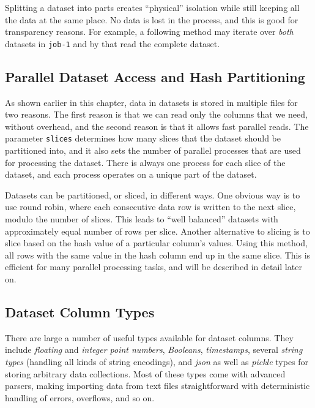 Splitting a dataset into parts creates ``physical'' isolation while
still keeping all the data at the same place.  No data is lost in the
process, and this is good for transparency reasons.  For example, a
following method may iterate over \textsl{both} datasets in
\texttt{job-1} and by that read the complete dataset.



\subsection{Parallel Dataset Access and Hash Partitioning}
As shown earlier in this chapter, data in datasets is stored in
multiple files for two reasons.  The first reason is that we can read
only the columns that we need, without overhead, and the second reason
is that it allows fast parallel reads.  The parameter \texttt{slices}
determines how many slices that the dataset should be partitioned
into, and it also sets the number of parallel processes that are used for
processing the dataset.  There is always one process for each slice of
the dataset, and each process operates on a unique part of the
dataset.

Datasets can be partitioned, or sliced, in different ways.  One
obvious way is to use round robin, where each consecutive data row is
written to the next slice, modulo the number of slices.  This leads to
``well balanced'' datasets with approximately equal number of rows per
slice.  Another alternative to slicing is to slice based on the hash
value of a particular column's values.  Using this method, all rows
with the same value in the hash column end up in the same slice.  This
is efficient for many parallel processing tasks, and will be described
in detail later on.




\subsection{Dataset Column Types}

There are large a number of useful types available for dataset
columns.  They include \textsl{floating} and \textsl{integer point
  numbers}, \textsl{Booleans}, \textsl{timestamps}, several
\textsl{string types} (handling all kinds of string encodings), and
\textsl{json} as well as \textsl{pickle} types for storing arbitrary
data collections.  Most of these types come with advanced parsers,
making importing data from text files straightforward with
deterministic handling of errors, overflows, and so on.



